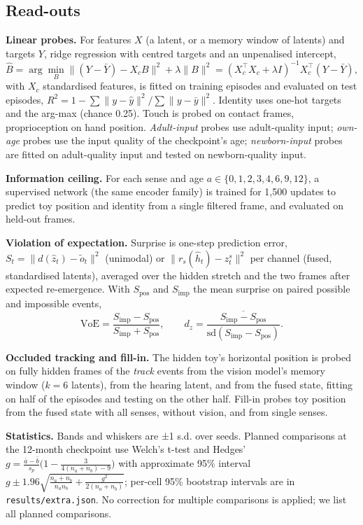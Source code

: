 \documentclass[
]{article}
\begin{document}
\hypertarget{read-outs}{%
\subsection{Read-outs}\label{read-outs}}

\textbf{Linear probes.} For features \(X\) (a latent, or a memory window
of latents) and targets \(Y\), ridge regression with centred targets and
an unpenalised intercept,
\[\hat B=\arg\min_B\lVert (Y-\bar Y)-X_cB\rVert^2+\lambda\lVert B\rVert^2=(X_c^\top X_c+\lambda I)^{-1}X_c^\top(Y-\bar Y),\]
with \(X_c\) standardised features, is fitted on training episodes and
evaluated on test episodes,
\(R^2=1-\sum\lVert y-\hat y\rVert^2/\sum\lVert y-\bar y\rVert^2\).
Identity uses one-hot targets and the arg-max (chance 0.25). Touch is
probed on contact frames, proprioception on hand position.
\emph{Adult-input} probes use adult-quality input; \emph{own-age} probes
use the input quality of the checkpoint's age; \emph{newborn-input}
probes are fitted on adult-quality input and tested on newborn-quality
input.

\textbf{Information ceiling.} For each sense and age
\(a\in\{0,1,2,3,4,6,9,12\}\), a supervised network (the same encoder
family) is trained for 1,500 updates to predict toy position and
identity from a single filtered frame, and evaluated on held-out frames.

\textbf{Violation of expectation.} Surprise is one-step prediction
error, \(S_t=\lVert d(\hat z_t)-\tilde o_t\rVert^2\) (unimodal) or
\(\lVert r_s(\hat h_t)-z^s_t\rVert^2\) per channel (fused, standardised
latents), averaged over the hidden stretch and the two frames after
expected re-emergence. With \(S_{\text{pos}}\) and \(S_{\text{imp}}\)
the mean surprise on paired possible and impossible events,
\[\mathrm{VoE}=\frac{S_{\text{imp}}-S_{\text{pos}}}{S_{\text{imp}}+S_{\text{pos}}},\qquad d_z=\frac{\overline{S_{\text{imp}}-S_{\text{pos}}}}{\mathrm{sd}(S_{\text{imp}}-S_{\text{pos}})}.\]

\textbf{Occluded tracking and fill-in.} The hidden toy's horizontal
position is probed on fully hidden frames of the \emph{track} events
from the vision model's memory window (\(k=6\) latents), from the
hearing latent, and from the fused state, fitting on half of the
episodes and testing on the other half. Fill-in probes toy position from
the fused state with all senses, without vision, and from single senses.

\textbf{Statistics.} Bands and whiskers are ±1 s.d. over seeds. Planned
comparisons at the 12-month checkpoint use Welch's t-test and Hedges'
\(g=\frac{\bar a-\bar b}{s_p}\big(1-\frac{3}{4(n_a+n_b)-9}\big)\) with
approximate 95\% interval
\(g\pm1.96\sqrt{\frac{n_a+n_b}{n_an_b}+\frac{g^2}{2(n_a+n_b)}}\);
per-cell 95\% bootstrap intervals are in \texttt{results/extra.json}. No
correction for multiple comparisons is applied; we list all planned
comparisons.
\end{document}
